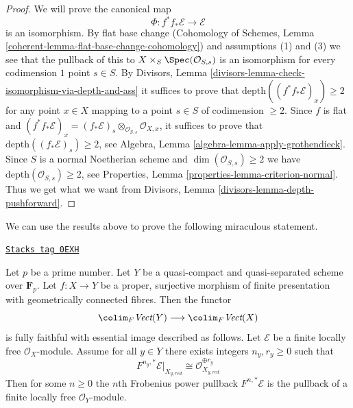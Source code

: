 \begin{proof}
We will prove the canonical map
$$
\Phi : f^*f_*\mathcal{E} \longrightarrow \mathcal{E}
$$
is an isomorphism. By flat base change (Cohomology of Schemes, Lemma
\ref{coherent-lemma-flat-base-change-cohomology})
and assumptions (1) and (3) we see that
the pullback of this to $X \times_S \Spec(\mathcal{O}_{S, s})$
is an isomorphism for every codimension $1$ point $s \in S$.
By Divisors, Lemma \ref{divisors-lemma-check-isomorphism-via-depth-and-ass}
it suffices to prove that $\text{depth}((f^*f_*\mathcal{E})_x) \geq 2$
for any point $x \in X$ mapping to a point $s \in S$ of codimension $\geq 2$.
Since $f$ is flat and
$(f^*f_*\mathcal{E})_x = (f_*\mathcal{E})_s \otimes_{\mathcal{O}_{S, s}}
\mathcal{O}_{X, x}$, it suffices to prove that
$\text{depth}((f_*\mathcal{E})_s) \geq 2$, see
Algebra, Lemma \ref{algebra-lemma-apply-grothendieck}.
Since $S$ is a normal Noetherian scheme
and $\dim(\mathcal{O}_{S, s}) \geq 2$
we have $\text{depth}(\mathcal{O}_{S, s}) \geq 2$, see
Properties, Lemma \ref{properties-lemma-criterion-normal}.
Thus we get what we want from
Divisors, Lemma \ref{divisors-lemma-depth-pushforward}.
\end{proof}

We can use the results above to prove the following
miraculous statement.

\begin{theorem}
\label{flat-theorem-pullback-trivial-fibres}
\href{https://stacks.math.columbia.edu/tag/0EXH}{\texttt{Stacks tag 0EXH}}

Let $p$ be a prime number. Let $Y$ be a quasi-compact and quasi-separated
scheme over $\mathbf{F}_p$.
Let $f : X \to Y$ be a proper, surjective morphism of finite presentation
with geometrically connected fibres.
Then the functor
$$
\colim_F \textit{Vect}(Y) \longrightarrow \colim_F \textit{Vect}(X)
$$
is fully faithful with essential image described as follows.
Let $\mathcal{E}$ be a finite locally free $\mathcal{O}_X$-module.
Assume for all $y \in Y$ there exists integers $n_y, r_y \geq 0$
such that
$$
F^{n_y, *}\mathcal{E}|_{X_{y, red}}
\cong
\mathcal{O}_{X_{y, red}}^{\oplus r_y}
$$
Then for some $n \geq 0$ the $n$th Frobenius power pullback
$F^{n, *}\mathcal{E}$ is the pullback of a finite locally free
$\mathcal{O}_Y$-module.
\end{theorem}

